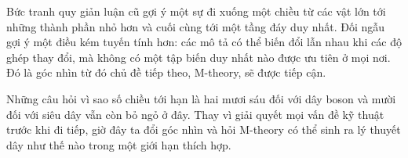 Bức tranh quy giản luận cũ gợi ý một sự đi xuống một chiều từ các vật lớn tới những thành phần nhỏ hơn và cuối cùng tới một tầng đáy duy nhất. Đối ngẫu gợi ý một điều kém tuyến tính hơn: các mô tả có thể biến đổi lẫn nhau khi các độ ghép thay đổi, mà không có một tập biến duy nhất nào được ưu tiên ở mọi nơi. Đó là góc nhìn từ đó chủ đề tiếp theo, M-theory, sẽ được tiếp cận.

Những câu hỏi vì sao số chiều tới hạn là hai mươi sáu đối với dây boson và mười đối với siêu dây vẫn còn bỏ ngỏ ở đây. Thay vì giải quyết mọi vấn đề kỹ thuật trước khi đi tiếp, giờ đây ta đổi góc nhìn và hỏi M-theory có thể sinh ra lý thuyết dây như thế nào trong một giới hạn thích hợp.
